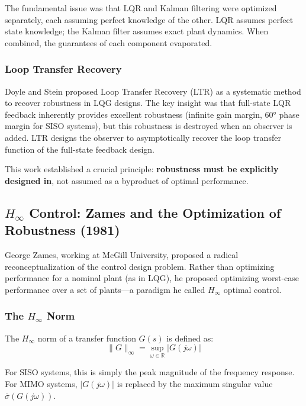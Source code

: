 The fundamental issue was that LQR and Kalman filtering were optimized separately, each assuming perfect knowledge of the other. LQR assumes perfect state knowledge; the Kalman filter assumes exact plant dynamics. When combined, the guarantees of each component evaporated.

\subsubsection{Loop Transfer Recovery}

Doyle and Stein proposed Loop Transfer Recovery (LTR) as a systematic method to recover robustness in LQG designs. The key insight was that full-state LQR feedback inherently provides excellent robustness (infinite gain margin, 60° phase margin for SISO systems), but this robustness is destroyed when an observer is added. LTR designs the observer to asymptotically recover the loop transfer function of the full-state feedback design.

This work established a crucial principle: \textbf{robustness must be explicitly designed in}, not assumed as a byproduct of optimal performance.

\subsection{$H_\infty$ Control: Zames and the Optimization of Robustness (1981)}
\label{subsec:zames}

George Zames, working at McGill University, proposed a radical reconceptualization of the control design problem. Rather than optimizing performance for a nominal plant (as in LQG), he proposed optimizing worst-case performance over a set of plants---a paradigm he called $H_\infty$ optimal control.

\subsubsection{The $H_\infty$ Norm}

The $H_\infty$ norm of a transfer function $G(s)$ is defined as:
\begin{equation}
\|G\|_\infty = \sup_{\omega \in \mathbb{R}} |G(j\omega)|
\label{eq:hinf_norm}
\end{equation}

For SISO systems, this is simply the peak magnitude of the frequency response. For MIMO systems, $|G(j\omega)|$ is replaced by the maximum singular value $\bar{\sigma}(G(j\omega))$.

